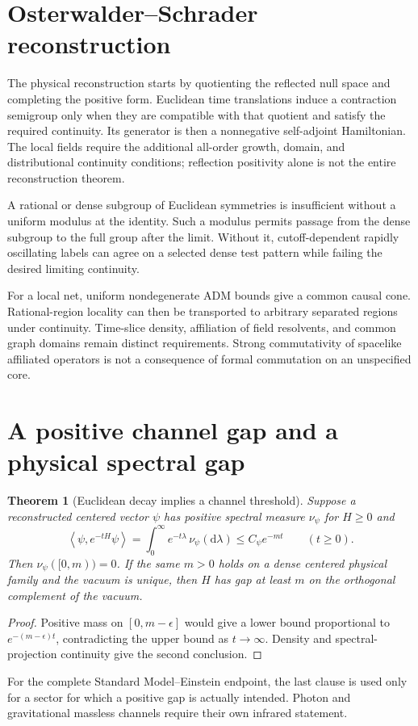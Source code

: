 \documentclass[11pt,a4paper,oneside]{book}
\theoremstyle{plain}
\newtheorem{theorem}{Theorem}[chapter]
\theoremstyle{definition}
\theoremstyle{remark}
\newcommand{\dd}{\mathrm d}
\newcommand{\pair}[2]{\left\langle#1,#2\right\rangle}
\newcommand{\src}[2]{\cite{#1}}
\begin{document}
\section{Osterwalder--Schrader reconstruction}
The physical reconstruction starts by quotienting the reflected null space and completing the positive form. Euclidean time translations induce a contraction semigroup only when they are compatible with that quotient and satisfy the required continuity. Its generator is then a nonnegative self-adjoint Hamiltonian. The local fields require the additional all-order growth, domain, and distributional continuity conditions; reflection positivity alone is not the entire reconstruction theorem. \src{R14}{thm:v14v88-time}

A rational or dense subgroup of Euclidean symmetries is insufficient without a uniform modulus at the identity. Such a modulus permits passage from the dense subgroup to the full group after the limit. Without it, cutoff-dependent rapidly oscillating labels can agree on a selected dense test pattern while failing the desired limiting continuity. \cite{R13,R16}

For a local net, uniform nondegenerate ADM bounds give a common causal cone. Rational-region locality can then be transported to arbitrary separated regions under continuity. Time-slice density, affiliation of field resolvents, and common graph domains remain distinct requirements. Strong commutativity of spacelike affiliated operators is not a consequence of formal commutation on an unspecified core. \cite{R13,R14}

\section{A positive channel gap and a physical spectral gap}
\begin{theorem}[Euclidean decay implies a channel threshold]
\label{thm:channel-gap}
Suppose a reconstructed centered vector $\psi$ has positive spectral measure $\nu_\psi$ for $H\ge0$ and
\begin{equation}
 \pair{\psi}{e^{-tH}\psi}
 =\int_0^\infty e^{-t\lambda}\,\nu_\psi(\dd\lambda)
 \le C_\psi e^{-mt}\qquad(t\ge0).
\end{equation}
Then $\nu_\psi([0,m))=0$. If the same $m>0$ holds on a dense centered physical family and the vacuum is unique, then $H$ has gap at least $m$ on the orthogonal complement of the vacuum.
\end{theorem}
\begin{proof}
Positive mass on $[0,m-\epsilon]$ would give a lower bound proportional to $e^{-(m-\epsilon)t}$, contradicting the upper bound as $t\to\infty$. Density and spectral-projection continuity give the second conclusion.
\end{proof}
\src{R16}{thm:v16v86-channel,thm:v16v86-dense-gap}
For the complete Standard Model--Einstein endpoint, the last clause is used only for a sector for which a positive gap is actually intended. Photon and gravitational massless channels require their own infrared statement.
\end{document}

